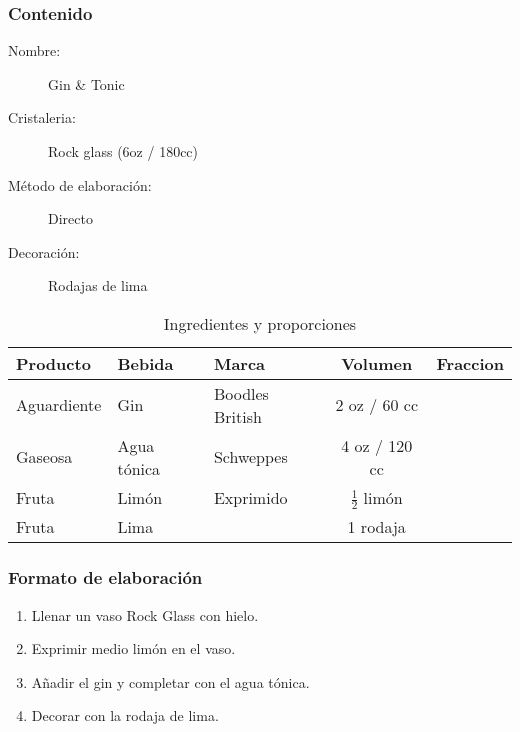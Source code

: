 \bigskip 
\bigskip 
 
\subsubsection{Contenido}
\bigskip 
\begin{description}
\item[Nombre:] Gin \& Tonic
\item[Cristaleria:] Rock glass (6oz / 180cc)
\item[M\'etodo de elaboraci\'on:] Directo
\item[Decoraci\'on:] Rodajas de lima
\end{description}

\begin{table}[h]
\caption{Ingredientes y proporciones} 
\label{tab:fonts}
\begin{center}       
\begin{tabular}{|l|l|l|c|l|} %
\hline
\rule[-1ex]{0pt}{3.5ex}  \textbf{Producto} & \textbf{Bebida} & \textbf{Marca} & \textbf{Volumen} & \textbf{Fraccion}  \\
\hline
\rule[-1ex]{0pt}{3.5ex}  Aguardiente & Gin 			& Boodles British 		& 2 oz / 60 cc 	&  	\\
\hline
\rule[-1ex]{0pt}{3.5ex}  Gaseosa		& Agua t\'onica 	& Schweppes 				& 4 oz / 120 cc 		&  	\\
\hline
\rule[-1ex]{0pt}{3.5ex}  Fruta 		& Lim\'on	 	& Exprimido				& $\frac{1}{2}$	lim\'on		& 	\\
\hline
\rule[-1ex]{0pt}{3.5ex}  Fruta 		& Lima		 	& 						& 1 rodaja		& 	\\
\hline
\end{tabular}
\end{center}
\end{table} 
\bigskip 

\subsubsection{Formato de elaboraci\'on} 
\label{sec:title}
\bigskip 
\begin{center}
\begin{enumerate}
\item Llenar un vaso Rock Glass con hielo.
\item Exprimir medio lim\'on en el vaso.
\item A\~nadir el gin y completar con el agua t\'onica.
\item Decorar con la rodaja de lima.
\end{enumerate}
\end{center}
\bigskip \bigskip 
\bigskip 

